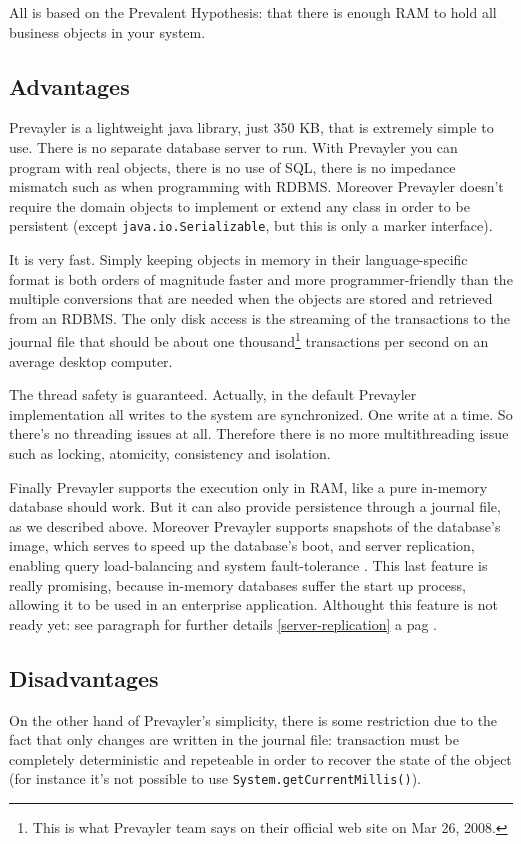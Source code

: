 		All is based on the Prevalent Hypothesis: that there is enough RAM to hold all business objects in your system. 	
		
			\subsection{Advantages}
			Prevayler is a lightweight java library, just 350 KB, that is extremely simple to use. There is no separate 
			database server to run. With Prevayler you can program with real objects, there is no use of SQL, there is 
			no impedance mismatch such as when programming with RDBMS. Moreover Prevayler doesn't require the 
			domain objects to implement or extend any class in order to be persistent (except \lstinline!java.io.Serializable!, but 
			this is only a marker interface).
			
			It is very fast. Simply keeping objects in memory in their language-specific format is both orders of magnitude 
			faster and more programmer-friendly than the multiple conversions that are needed when the objects are stored 
			and retrieved from an RDBMS. The only disk access is the streaming of the transactions to the journal file that 
			should be about one thousand\footnote{This is what Prevayler team says on their official web site on 
			Mar 26, 2008.} transactions per second on an average desktop computer.
			
			The thread safety is guaranteed. Actually, in the default Prevayler implementation all writes to the 
			system are synchronized. One write at a time. So there's no threading issues at all. Therefore 
			there is no more multithreading issue such as locking, atomicity, consistency and isolation.
			
			Finally Prevayler supports the execution only in RAM, like a pure in-memory database should work. But 
			it can also provide persistence through a journal file, as we described above. Moreover Prevayler 
			supports snapshots of the database's image, which serves to speed up the database's boot, 
			and server replication, enabling query load-balancing and 
			system fault-tolerance \cite{Prevayler}. This last feature is really promising, 
			because in-memory databases suffer the start up 
			process, allowing it to be used in an enterprise application. Althought this feature is not ready yet: 
			see paragraph for further details \ref{server-replication} a pag \pageref{server-replication}.
    			
			\subsection{Disadvantages}
			On the other hand of Prevayler's simplicity, there is some restriction due to the fact that only changes 
			are written in the journal file: transaction must be completely deterministic and repeteable in order 
			to recover the state of the object (for instance it's not possible to use \lstinline!System.getCurrentMillis()!).
			
